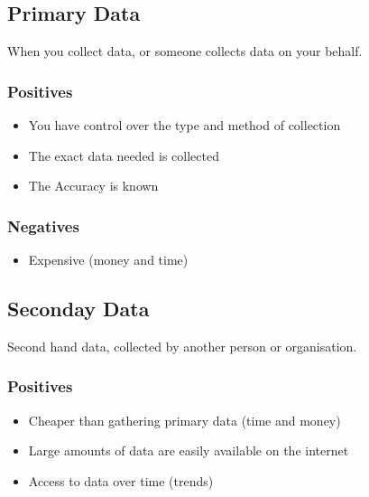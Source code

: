 \documentclass{article}
\begin{document}
\subsection{Primary Data}

When you collect data, or someone collects data on your behalf.

\subsubsection{Positives}

\begin{itemize}

    \item You have control over the type and method of collection
    \item The exact data needed is collected
    \item The Accuracy is known

\end{itemize}

\subsubsection{Negatives}

\begin{itemize}

    \item Expensive (money and time)
    
\end{itemize}

\subsection{Seconday Data}

Second hand data, collected by another person or organisation.

\subsubsection{Positives}
        
\begin{itemize}

    \item Cheaper than gathering primary data (time and money)
    \item Large amounts of data are easily available on the internet
    \item Access to data over time (trends)
    
\end{itemize}
\end{document}
